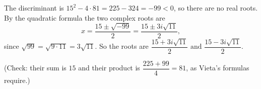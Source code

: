 The discriminant is $15^2-4\cdot81=225-324=-99<0$, so there are no real roots. By the quadratic formula the two complex roots are
\[x=\dfrac{15\pm\sqrt{-99}}{2}=\dfrac{15\pm3i\sqrt{11}}{2},\]
since $\sqrt{99}=\sqrt{9\cdot11}=3\sqrt{11}$. So the roots are $\boxed{\dfrac{15+3i\sqrt{11}}{2}\text{ and }\dfrac{15-3i\sqrt{11}}{2}}$.

(Check: their sum is $15$ and their product is $\dfrac{225+99}{4}=81$, as Vieta's formulas require.)
